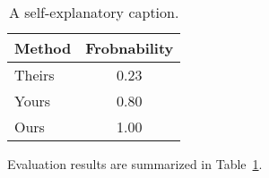 \begin{table}
  \centering
  \caption{A self-explanatory caption.}
  \label{tab:example1}
  \begin{tabular}{l|c}
    \textbf{Method} & \textbf{Frobnability}\\\hline
    Theirs & 0.23 \\
    Yours  & 0.80 \\
    Ours   & 1.00 \\\hline
  \end{tabular}
\end{table}

Evaluation results are summarized in Table~\ref{tab:example1}.
